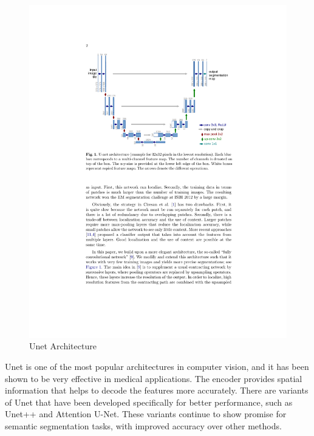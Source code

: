 \begin{figure}[h]
    \centering
    \includegraphics[width=\textwidth]{content/resources/new_images/related_works/unet.pdf}
    \caption{Unet Architecture}
    \label{fig:unet}
\end{figure}

Unet\cite{Unet} is one of the most popular architectures in computer vision, and it has been shown to be very effective in medical applications. The encoder provides spatial information that helps to decode the features more accurately. There are variants of Unet that have been developed specifically for better performance, such as Unet++\cite{UnetPP} and Attention U-Net\cite{AttUnet}. These variants continue to show promise for semantic segmentation tasks, with improved accuracy over other methods.

